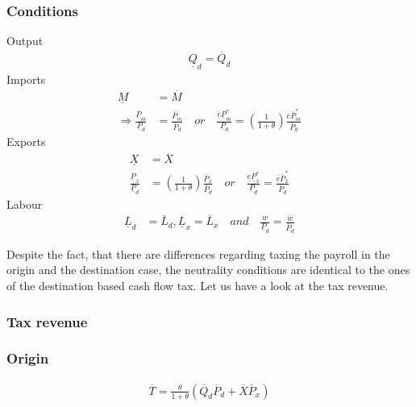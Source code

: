\subsubsection*{Conditions}

Output
\begin{equation}
\begin{aligned}
\underline Q_d = \overline Q_d
\end{aligned}
\end{equation}
\newline
\noindent Imports
\begin{equation}
\begin{aligned}
\underline M &= \overline M \\
\Rightarrow \frac{\underline P_m}{\underline P_d} &= \frac{\overline P_m}{\overline P_d} \quad or \quad \frac{\underline e \underline P_m^*}{\underline P_d} =  \left( \frac{1}{1+\theta} \right) \frac{\overline e \overline P^*_m}{\overline P_d}
\end{aligned}
\end{equation}
\noindent Exports
\begin{equation}
\begin{aligned}
\underline X &= \overline X \\ \frac{\underline P_x}{\underline P_d} &=  \left( \frac{1}{1+\theta} \right) \frac{\overline P_x}{\overline P_d} \quad or \quad \frac{\underline e \underline P_x^*}{\underline P_d} = \frac{\overline e \overline P^*_x}{\overline P_d}
\end{aligned}
\end{equation}
\noindent Labour
\begin{equation}
\begin{aligned}
\underline L_d &= \overline L_d, \underline L_x = \overline L_x \quad and \quad \frac{\underline w}{\underline P_d} = \frac{\overline w}{\overline P_d}
\end{aligned}
\end{equation}

Despite the fact, that there are differences regarding taxing the payroll in the origin and the destination case, the neutrality conditions are identical to the ones of the destination based cash flow tax. Let us have a look at the tax revenue. 

\subsubsection{Tax revenue}
\subsubsection*{Origin} 
\begin{equation} 
\begin{aligned}
\overline T = \frac{\theta}{1+\theta} \left( \overline Q_d \overline P_d + \overline X \overline P_x \right) 
\end{aligned} 
\end{equation}

